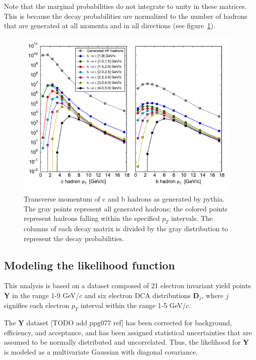 \documentclass[12pt]{article}
\newcommand{\pt}{p_T}
\newcommand{\eptdata}{\mathbf{Y}}
\newcommand{\dcadata}{\mathbf{D}_j}
\begin{document}
Note that the marginal probabilities do not integrate to unity in these matrices. This is because the decay probabilities are normalized to the number of hadrons that are generated at all momenta and in all directions (see figure~\ref{fig:gen}).
\begin{figure}[tb]
  \begin{center}
    \includegraphics[width=0.98\textwidth]{hpt-gen}
  \end{center}
  \caption{Transverse momentum of c and b hadrons as generated by pythia. The gray points represent all generated hadrons; the colored points represent hadrons falling within the specified $\pt$ intervals. The columns of each decay matrix is divided by the gray distribution to represent the decay probabilities.}
  \label{fig:gen}
\end{figure}


\subsection{Modeling the likelihood function}
This analysis is based on a dataset composed of 21 electron invariant yield points $\eptdata$ in the range 1-9 GeV/$c$ and six electron DCA distributions $\dcadata$, where $j$ signifies each electron $\pt$ interval within the range 1-5 GeV/$c$.

The $\eptdata$ dataset [TODO add ppg077 ref] has been corrected for background, efficiency, and acceptance, and has been assigned statistical uncertainties that are assumed to be normally distributed and uncorrelated. Thus, the likelihood for $\eptdata$ is modeled as a multivariate Gaussian with diagonal covariance.
\end{document}
